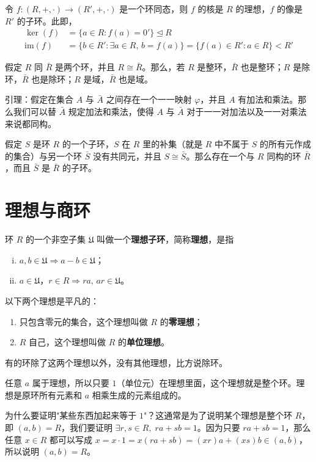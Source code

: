 \begin{proposition}
令 $f:(R,+,\cdot)\to(R',+,\cdot)$ 是一个环同态，则 $f$ 的核是 $R$ 的理想，$f$ 的像是 $R'$ 的子环。此即，
\begin{align}
\ker(f)&=\{a\in R:f(a)=0'\}\trianglelefteq R\\
\mathrm{im}(f)&=\{b\in R':\exists a\in R,\,b=f(a)\}=\{f(a)\in R':a\in R\}<R'
\end{align}
\end{proposition}

\begin{theorem}
假定 $R$ 同 $\bar{R}$ 是两个环，并且 $R\cong\bar{R}$。那么，若 $R$ 是整环，$\bar{R}$ 也是整环；$R$ 是除环，$\bar{R}$ 也是除环；$R$ 是域，$\bar{R}$ 也是域。

引理：假定在集合 $A$ 与 $\bar{A}$ 之间存在一个一一映射 $\varphi$，并且 $A$ 有加法和乘法。那么我们可以替 $\bar{A}$ 规定加法和乘法，使得 $A$ 与 $\bar{A}$ 对于一一对加法以及一一对乘法来说都同构。
\end{theorem}

\begin{theorem}[定理 4]
假定 $S$ 是环 $R$ 的一个子环，$S$ 在 $R$ 里的补集（就是 $R$ 中不属于 $S$ 的所有元作成的集合）与另一个环 $\bar{S}$ 没有共同元，并且 $S\cong\bar{S}$。那么存在一个与 $R$ 同构的环 $\bar{R}$，而且 $\bar{S}$ 是 $\bar{R}$ 的子环。
\end{theorem}

\section{理想与商环}

\begin{definition}[理想子环定义]
环 $R$ 的一个非空子集 $\mathfrak{U}$ 叫做一个\textbf{理想子环}，简称\textbf{理想}，是指
\begin{enumerate}[(i)]
  \item $a,b\in\mathfrak{U}\Rightarrow a-b\in\mathfrak{U}$；
  \item $a\in\mathfrak{U}$，$r\in R\Rightarrow ra,\,ar\in\mathfrak{U}$。
\end{enumerate}

以下两个理想是平凡的：
\begin{enumerate}
  \item 只包含零元的集合，这个理想叫做 $R$ 的\textbf{零理想}；
  \item $R$ 自己，这个理想叫做 $R$ 的\textbf{单位理想}。
\end{enumerate}
有的环除了这两个理想以外，没有其他理想，比方说除环。

任意 $a$ 属于理想，所以只要 $1$（单位元）在理想里面，这个理想就是整个环。理想是原环所有元素和 $a$ 相乘生成的元素组成的。

为什么要证明"某些东西加起来等于 $1$"？这通常是为了说明某个理想是整个环 $R$，即 $(a,b)=R$，我们要证明 $\exists r,s\in R,\;ra+sb=1$。因为只要 $ra+sb=1$，那么任意 $x\in R$ 都可以写成 $x=x\cdot 1=x(ra+sb)=(xr)a+(xs)b\in(a,b)$，所以说明 $(a,b)=R$。
\end{definition}

